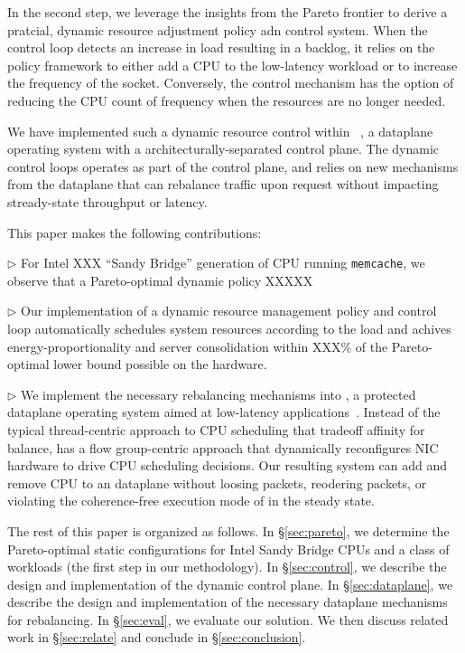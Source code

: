 In the second step, we leverage the insights from the Pareto frontier
to derive a pratcial, dynamic resource adjustment policy adn control system.
When the control loop detects an increase in load
resulting in a backlog, it relies on the policy framework to either
add a CPU to the low-latency workload or to increase the frequency of
the socket.  Conversely, the control mechanism has the option of
reducing the CPU count of frequency when the resources are no longer
needed.

We have implemented such a dynamic resource control within \ix~\cite{ix-osdi}, a dataplane
operating system with a architecturally-separated control plane.  The
dynamic control loops operates as part of the control plane, and
relies on new mechanisms from the \ix dataplane that can rebalance
traffic upon request without impacting stready-state throughput or
latency.


This paper makes the following contributions:

$\triangleright$ For Intel XXX ``Sandy Bridge'' generation of CPU
running \texttt{memcache}, we observe that a Pareto-optimal dynamic
policy XXXXX


$\triangleright$ Our implementation of a dynamic resource management
policy and control loop automatically schedules system resources
according to the load and achives energy-proportionality and server
consolidation within XXX\% of the Pareto-optimal lower bound possible on the
hardware.

$\triangleright$ We implement the necessary rebalancing mechanisms
into \ix, a protected dataplane operating system aimed at low-latency
applications~\cite{ix-osdi}.  Instead of the typical thread-centric
approach to CPU scheduling that tradeoff affinity for balance, \ix has
a flow group-centric approach that dynamically reconfigures NIC
hardware to drive CPU scheduling decisions.  Our resulting system can
add and remove CPU to an \ix dataplane without loosing packets,
reodering packets, or violating the coherence-free execution mode of \ix in the steady state.

The rest of this paper is organized as follows. 
In \S\ref{sec:pareto}, we determine the Pareto-optimal static configurations for Intel
Sandy Bridge CPUs and a class of workloads (the first step in our
methodology).  In \S\ref{sec:control}, we describe the design and
implementation of the dynamic control plane.  In
\S\ref{sec:dataplane}, we describe the design and implementation of
the necessary dataplane mechanisms for rebalancing.  In
\S\ref{sec:eval}, we evaluate our solution.  We then discuss related
work in \S\ref{sec:relate} and conclude in \S\ref{sec:conclusion}.




